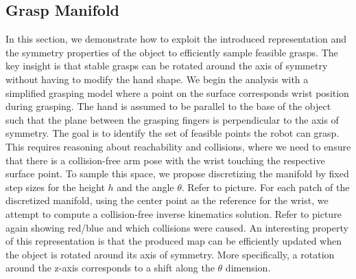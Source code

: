 \documentclass{aamas2015}
\begin{document}
\subsection{Grasp Manifold}
 In this section, we demonstrate how to exploit the introduced representation and the symmetry properties of the object to efficiently sample feasible grasps. The key insight is that stable grasps can be rotated around the axis of symmetry without having to modify the hand shape. We begin the analysis with a simplified grasping model where a point on the surface corresponds wrist position during grasping. The hand is assumed to be parallel to the base of the object such that the plane between the grasping fingers is perpendicular to the axis of symmetry. The goal is to identify the set of feasible points the robot can grasp. This requires reasoning about reachability and collisions, where we need to ensure that there is a collision-free arm pose with the wrist touching the respective surface point. To sample this space, we propose discretizing the manifold by fixed step sizes for the height $h$ and the angle $\theta$. Refer to picture. For each patch of the discretized manifold, using the center point  as the reference for the wrist, we attempt to compute a collision-free inverse kinematics solution. Refer to picture again showing red/blue and which collisions were caused. An interesting property of this representation is that the produced map can be efficiently updated when the object is rotated around its axis of symmetry. More specifically, a rotation around the z-axis corresponds to a shift along the $\theta$ dimension. 
\end{document}
